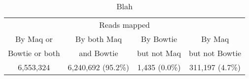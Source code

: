 \documentclass[letterpaper]{article}
\begin{document}
\begin{table}[tp]
\scriptsize
\begin{tabular}{cccc}
\multicolumn{4}{c}{Reads mapped} \\[3pt] 
By Maq or     & By both Maq & By Bowtie    & By Maq         \\ 
Bowtie or both & and Bowtie   & but not Maq & but not Bowtie \\ 
\toprule
6,553,324 & 6,240,692 (95.2\%) & 1,435 (0.0\%) & 311,197 (4.7\%) \\ 
\bottomrule
\end{tabular}
\caption{Blah}
\end{table}
\end{document}
